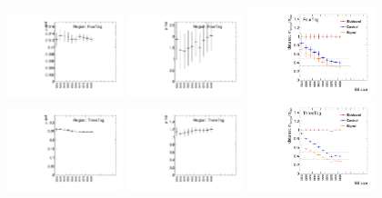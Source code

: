 \begin{figure}[htbp!]
\begin{center}
\includegraphics[width=0.3\textwidth,angle=-90]{figures/boosted/Appendix_SB/FourTag_muqcdSB.pdf}
\includegraphics[width=0.3\textwidth,angle=-90]{figures/boosted/Appendix_SB/FourTag_mutopSB.pdf}
\includegraphics[width=0.33\textwidth,angle=-90]{figures/boosted/Appendix_SB/data_est_FourTag_sigma_compareSB.pdf}\\
\includegraphics[width=0.3\textwidth,angle=-90]{figures/boosted/Appendix_SB/ThreeTag_muqcdSB.pdf}
\includegraphics[width=0.3\textwidth,angle=-90]{figures/boosted/Appendix_SB/ThreeTag_mutopSB.pdf}
\includegraphics[width=0.33\textwidth,angle=-90]{figures/boosted/Appendix_SB/data_est_ThreeTag_sigma_compareSB.pdf}\\

\end{center}
\end{figure}
